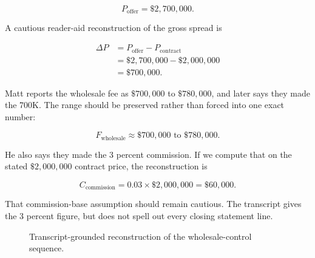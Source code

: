 \begin{equation}
P_{\text{offer}}=\$2{,}700{,}000.
\end{equation}

A cautious reader-aid reconstruction of the gross spread is

\begin{align}
\Delta P
  &=P_{\text{offer}}-P_{\text{contract}}\\
  &=\$2{,}700{,}000-\$2{,}000{,}000\\
  &=\$700{,}000.
\end{align}

Matt reports the wholesale fee as \(\$700{,}000\) to \(\$780{,}000\), and later says they made the 700K. The range should be preserved rather than forced into one exact number:

\begin{equation}
F_{\text{wholesale}}\approx \$700{,}000\text{ to }\$780{,}000.
\end{equation}

He also says they made the 3 percent commission. If we compute that on the stated \(\$2{,}000{,}000\) contract price, the reconstruction is

\begin{equation}
C_{\text{commission}}
=
0.03 \times \$2{,}000{,}000
=
\$60{,}000.
\end{equation}

That commission-base assumption should remain cautious. The transcript gives the 3 percent figure, but does not spell out every closing statement line.

\begin{figure}
\centering
{}
\caption{Transcript-grounded reconstruction of the wholesale-control sequence.}
\end{figure}

